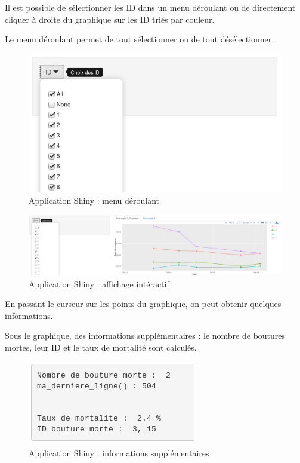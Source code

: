 \documentclass[]{report}
\begin{document}
Il est possible de sélectionner les ID dans un menu déroulant ou de
directement cliquer à droite du graphique sur les ID triés par couleur.

Le menu déroulant permet de tout sélectionner ou de tout désélectionner.

\begin{figure}[h!]
\includegraphics[]{../image/shiny4.PNG}
\caption{Application Shiny : menu déroulant}
\end{figure}

\begin{figure}[h!]
\includegraphics[]{../image/shiny5.PNG}
\caption{Application Shiny : affichage intéractif}
\end{figure}

En passant le curseur sur les points du graphique, on peut obtenir
quelques informations.

Sous le graphique, des informations supplémentaires : le nombre de
boutures mortes, leur ID et le taux de mortalité sont calculés.

\begin{figure}[h!]
\includegraphics[]{../image/shiny7.PNG}
\caption{Application Shiny : informations supplémentaires}
\end{figure}
\end{document}

